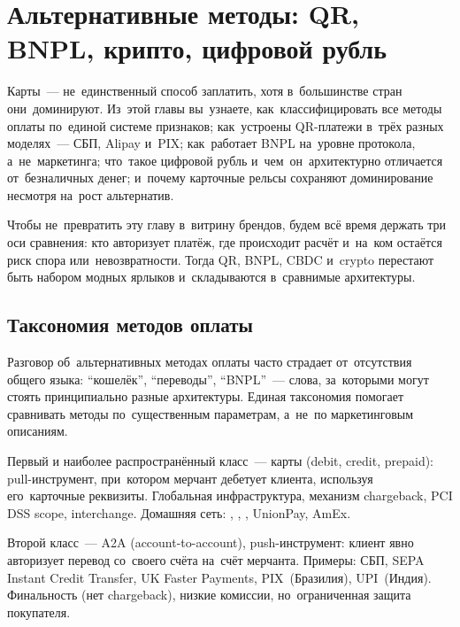 \chapter{Альтернативные методы: QR, BNPL, крипто, цифровой рубль}
\label{ch:alt-methods}

\begin{kaobox}[title=Что вы узнаете из этой главы]
  Карты~--- не~единственный способ заплатить, хотя в~большинстве стран
  они~доминируют. Из~этой главы вы~узнаете, как~классифицировать все методы
  оплаты по~единой системе признаков; как~устроены QR-платежи в~трёх
  разных моделях~--- СБП, Alipay и~PIX; как~работает BNPL на~уровне
  протокола, а~не~маркетинга; что~такое цифровой рубль и~чем~он~архитектурно
  отличается от~безналичных денег; и~почему карточные рельсы сохраняют
  доминирование несмотря на~рост альтернатив.
\end{kaobox}

Чтобы не~превратить эту главу в~витрину брендов, будем всё время
держать три оси сравнения: кто авторизует платёж, где происходит
расчёт и~на~ком остаётся риск спора или~невозвратности. Тогда QR,
BNPL, CBDC и~crypto перестают быть набором модных ярлыков
и~складываются в~сравнимые архитектуры.


\section{Таксономия методов оплаты}
\label{sec:alt-taxonomy}

Разговор об~альтернативных методах оплаты часто страдает от~отсутствия
общего языка: \enquote{кошелёк}, \enquote{переводы}, \enquote{BNPL}~---
слова, за~которыми могут стоять принципиально разные архитектуры. Единая
таксономия помогает сравнивать методы по~существенным параметрам, а~не~по
маркетинговым описаниям.

Первый и наиболее распространённый класс~--- карты (debit, credit, prepaid):
pull-инструмент, при~котором мерчант дебетует клиента, используя его~карточные
реквизиты. Глобальная инфраструктура, механизм chargeback, PCI DSS scope,
interchange. Домашняя сеть: , , ,
UnionPay, AmEx.

Второй класс~--- A2A (account-to-account), push-инструмент: клиент явно
авторизует перевод со~своего счёта на~счёт мерчанта. Примеры: СБП,
SEPA Instant Credit Transfer, UK Faster Payments, PIX~(Бразилия), UPI~(Индия).
Финальность (нет chargeback), низкие комиссии, но~ограниченная защита
покупателя.


